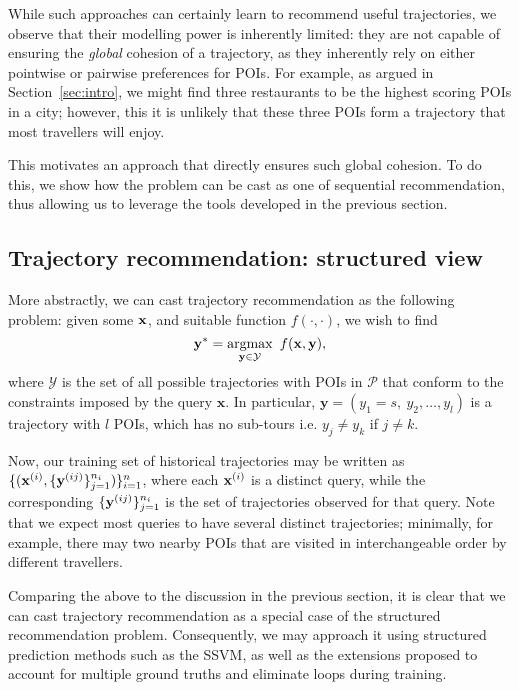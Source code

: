 While such approaches can certainly learn to recommend useful trajectories,
we observe that their modelling power is inherently limited:
they are not capable of ensuring the \emph{global} cohesion of a trajectory,
as they inherently rely on either pointwise or pairwise preferences for POIs.
For example, as argued in Section~\ref{sec:intro},
we might find three restaurants to be the highest scoring POIs in a city;
however, this it is unlikely that these three POIs form a trajectory that most travellers will enjoy.

This motivates an approach that directly ensures such global cohesion.
To do this, we show how the problem can be cast as one of sequential recommendation, 
thus allowing us to leverage the tools developed in the previous section.


%
\subsection{Trajectory recommendation: structured view}

More abstractly, we can cast trajectory recommendation as the following problem:
given some $\mathbf{x}$, and suitable function $f(\cdot,\cdot)$, we wish to find
\begin{equation*}
\mathbf{y}^* = \operatorname*{argmax}_{\mathbf{y} \in \mathcal{Y}}~f(\mathbf{x}, \mathbf{y}),
\end{equation*}
where $\mathcal{Y}$ is the set of all possible trajectories with POIs in $\mathcal{P}$ that conform to the constraints imposed by the query $\mathbf{x}$.
In particular,
$\mathbf{y} = (y_1 = s,~ y_2, \dots, y_l)$ is a trajectory with $l$ POIs, which has no sub-tours i.e. $y_j \ne y_k$ if $j \ne k$.

Now, our training set of historical trajectories may be written as
$\{ ( \mathbf{x}^{({i})}, \{ \mathbf{y}^{({ij})} \}_{j=1}^{n_i} ) \}_{i=1}^{n}$,
where each $\mathbf{x}^{({i})}$ is a distinct query,
while the corresponding $\{ \mathbf{y}^{({ij})} \}_{j=1}^{n_i}$ is the set of trajectories observed for that query.
Note that we expect most queries to have several distinct trajectories;
minimally,
for example,
there may two nearby POIs that are visited in interchangeable order by different travellers.

Comparing the above to the discussion in the previous section, it is clear that
we can cast trajectory recommendation as a special case of the structured recommendation problem.
Consequently, we may approach it using structured prediction methods such as the SSVM,
as well as the extensions proposed to account for multiple ground truths and eliminate loops during training.

